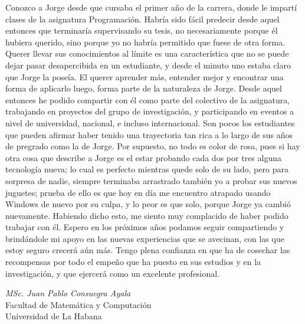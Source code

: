 \begin{opinion}
Conozco a Jorge desde que cursaba el primer año de la carrera, donde le impartí clases de la asignatura Programación. Habría sido fácil predecir desde aquel entonces que terminaría supervisando su tesis, no necesariamente porque él hubiera querido, sino porque yo no habría permitido que fuese de otra forma. Querer llevar sus conocimientos al límite es una característica que no se puede dejar pasar desapercibida en un estudiante, y desde el minuto uno estaba claro que Jorge la poseía. El querer aprender más, entender mejor y encontrar una forma de aplicarlo luego, forma parte de la naturaleza de Jorge. Desde aquel entonces he podido compartir con él como parte del colectivo de la asignatura, trabajando en proyectos del grupo de investigación, y participando en eventos a nivel de universidad, nacional, e incluso internacional. Son pocos los estudiantes que pueden afirmar haber tenido una trayectoria tan rica a lo largo de sus años de pregrado como la de Jorge. Por supuesto, no todo es color de rosa, pues si hay otra cosa que describe a Jorge es el estar probando cada dos por tres alguna tecnología nueva; lo cual es perfecto mientras quede solo de su lado, pero para sorpresa de nadie, siempre terminaba arrastrado también yo a probar sus nuevos juguetes; prueba de ello es que hoy en día me encuentro atrapado usando Windows de nuevo por su culpa, y lo peor es que solo, porque Jorge ya cambió nuevamente. Habiendo dicho esto, me siento muy complacido de haber podido trabajar con él. Espero en los próximos años podamos seguir compartiendo y brindándole mi apoyo en las nuevas experiencias que se avecinan, con las que estoy seguro crecerá aún más. Tengo plena confianza en que ha de cosechar las recompensas por todo el empeño que ha puesto en sus estudios y en la investigación, y que ejercerá como un excelente profesional.


\vspace{1cm}

\begin{flushright}
\emph{MSc. Juan Pablo Consuegra Ayala}\\
    Facultad de Matemática y Computación \\
    Universidad de La Habana    
\end{flushright}

\end{opinion}